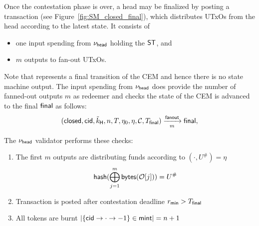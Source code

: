 \noindent Once the contestation phase is over, a head may be finalized by posting a
\mtxFanout{} transaction (see Figure~\ref{fig:SM_closed_final}), which
distributes UTxOs from the head according to the latest state. It consists of
\begin{itemize}
  \item one input spending from $\nu_\mathsf{head}$ holding the $\mathsf{ST}$, and
  \item $m$ outputs to fan-out UTxOs.
\end{itemize}
Note that \mtxFanout{} represents a final transition of the CEM and hence there
is no state machine output. The input spending from $\nu_\mathsf{head}$ does provide the
number of fanned-out outputs $m$ as redeemer and checks the state of the CEM is
advanced to the final $\mathsf{final}$ as follows:
\[
  (\mathsf{closed},\mathsf{cid},\tilde{k}_{\mathsf{H}},n,T,\eta_0,\eta,\mathcal{C},T_{\mathsf{final}}) \xrightarrow[m]{\mathsf{fanout}} \mathsf{final},
\]

\noindent The $\nu_\mathsf{head}$ validator performs these checks:
\begin{enumerate}
  \item The first $m$ outputs are distributing funds according to
        $(\cdot, U^{\#}) = \eta$
        \[
        \mathsf{hash}(\bigoplus_{j=1}^{m} \mathsf{bytes}(\mathcal{O}[j])) = U^{\#}
        \]
  \item Transaction is posted after contestation deadline $r_{\mathsf{min}} > T_{\mathsf{final}}$
  \item All tokens are burnt
        $|\{\mathsf{cid} \rightarrow \cdot \rightarrow -1\} \in \mathsf{mint}| = n + 1$
\end{enumerate}

